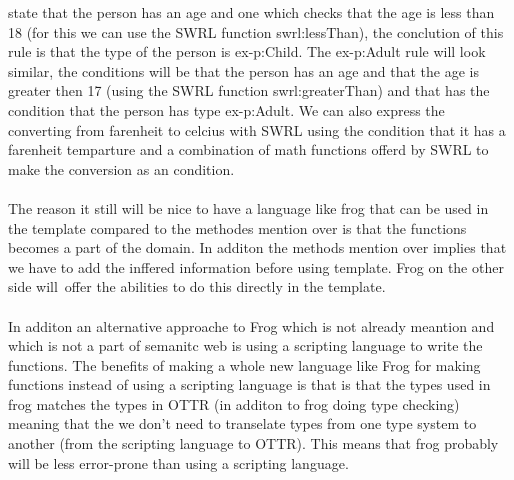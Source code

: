 state that the person has an age and one which checks that the age is less than 18 (for this we can use the SWRL function
swrl:lessThan), the conclution of this rule is that the type of the person is ex-p:Child. The ex-p:Adult rule will look 
similar, the conditions will be that the person has an age and that the age is greater then 17 (using the SWRL function 
swrl:greaterThan) and that has the condition that the person has type ex-p:Adult. We can also express the converting from farenheit
to celcius with SWRL using the condition that it has a farenheit temparture and a combination of math functions offerd by SWRL to 
make the conversion as an condition.
\\ \\
The reason it still will be nice to have a language like frog that can be used in the template compared to the 
methodes mention over is that the functions becomes a part of the domain. In additon the methods mention over implies
that we have to add the inffered information before using template. Frog on the other side will offer the abilities to 
do this directly in the template. 
\\ \\
In additon an alternative approache to Frog which is not already meantion and which is not a part of semanitc web 
is using a scripting language to write the functions.
The benefits of making a whole new language like Frog for making functions instead of using a scripting language is 
that is that the types used in frog matches the types in OTTR (in additon to frog doing type checking) meaning that 
the we don't need to transelate types from one type system to another (from the scripting language to OTTR). This means 
that frog probably will be less error-prone than using a scripting language.